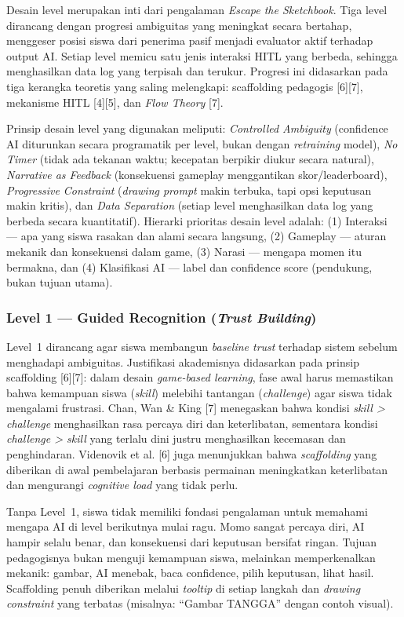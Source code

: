 \documentclass[12pt,oneside]{report}
\begin{document}
Desain level merupakan inti dari pengalaman \textit{Escape the Sketchbook}. Tiga level dirancang dengan progresi ambiguitas yang meningkat secara bertahap, menggeser posisi siswa dari penerima pasif menjadi evaluator aktif terhadap output AI. Setiap level memicu satu jenis interaksi HITL yang berbeda, sehingga menghasilkan data log yang terpisah dan terukur. Progresi ini didasarkan pada tiga kerangka teoretis yang saling melengkapi: scaffolding pedagogis [6][7], mekanisme HITL [4][5], dan \textit{Flow Theory} [7].

Prinsip desain level yang digunakan meliputi: \textit{Controlled Ambiguity} (confidence AI diturunkan secara programatik per level, bukan dengan \textit{retraining} model), \textit{No Timer} (tidak ada tekanan waktu; kecepatan berpikir diukur secara natural), \textit{Narrative as Feedback} (konsekuensi gameplay menggantikan skor/leaderboard), \textit{Progressive Constraint} (\textit{drawing prompt} makin terbuka, tapi opsi keputusan makin kritis), dan \textit{Data Separation} (setiap level menghasilkan data log yang berbeda secara kuantitatif). Hierarki prioritas desain level adalah: (1) Interaksi --- apa yang siswa rasakan dan alami secara langsung, (2) Gameplay --- aturan mekanik dan konsekuensi dalam game, (3) Narasi --- mengapa momen itu bermakna, dan (4) Klasifikasi AI --- label dan confidence score (pendukung, bukan tujuan utama).

\subsubsection{Level 1 --- Guided Recognition (\textit{Trust Building})}

Level~1 dirancang agar siswa membangun \textit{baseline trust} terhadap sistem sebelum menghadapi ambiguitas. Justifikasi akademisnya didasarkan pada prinsip scaffolding [6][7]: dalam desain \textit{game-based learning}, fase awal harus memastikan bahwa kemampuan siswa (\textit{skill}) melebihi tantangan (\textit{challenge}) agar siswa tidak mengalami frustrasi. Chan, Wan \& King [7] menegaskan bahwa kondisi \textit{skill > challenge} menghasilkan rasa percaya diri dan keterlibatan, sementara kondisi \textit{challenge > skill} yang terlalu dini justru menghasilkan kecemasan dan penghindaran. Videnovik et al. [6] juga menunjukkan bahwa \textit{scaffolding} yang diberikan di awal pembelajaran berbasis permainan meningkatkan keterlibatan dan mengurangi \textit{cognitive load} yang tidak perlu.

Tanpa Level~1, siswa tidak memiliki fondasi pengalaman untuk memahami mengapa AI di level berikutnya mulai ragu. Momo sangat percaya diri, AI hampir selalu benar, dan konsekuensi dari keputusan bersifat ringan. Tujuan pedagogisnya bukan menguji kemampuan siswa, melainkan memperkenalkan mekanik: gambar, AI menebak, baca confidence, pilih keputusan, lihat hasil. Scaffolding penuh diberikan melalui \textit{tooltip} di setiap langkah dan \textit{drawing constraint} yang terbatas (misalnya: ``Gambar TANGGA'' dengan contoh visual).
\end{document}
